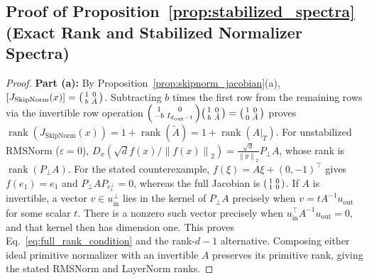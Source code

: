\documentclass[10pt]{article}
\theoremstyle{definition}
\theoremstyle{remark}
\newcommand{\norm}[1]{\left\lVert #1 \right\rVert}
\DeclareMathOperator{\rank}{rank}
\begin{document}
\subsection{Proof of Proposition~\ref{prop:stabilized_spectra} (Exact Rank and Stabilized Normalizer Spectra)}

\begin{proof}
\textbf{Part (a):} By Proposition~\ref{prop:skipnorm_jacobian}(a), $[J_{\mathrm{SkipNorm}}(x)] = \begin{psmallmatrix} 1 & 0 \\ b & \tilde{A} \end{psmallmatrix}$. Subtracting $b$ times the first row from the remaining rows via the invertible row operation $\begin{psmallmatrix} 1 & 0 \\ -b & I_{d_{\mathrm{out}}-1} \end{psmallmatrix} \begin{psmallmatrix} 1 & 0 \\ b & \tilde{A} \end{psmallmatrix} = \begin{psmallmatrix} 1 & 0 \\ 0 & \tilde{A} \end{psmallmatrix}$ proves $\rank(J_{\mathrm{SkipNorm}}(x)) = 1 + \rank(\tilde{A}) = 1 + \rank(A|_T)$. For unstabilized RMSNorm ($\varepsilon = 0$), $D_x (\sqrt{d} f(x)/\norm{f(x)}_2) = \frac{\sqrt{d}}{\norm{y}_2} P_\perp A$, whose rank is $\rank(P_\perp A)$. For the stated counterexample, $f(\xi)=A\xi+(0,-1)^\top$ gives $f(e_1)=e_1$ and $P_\perp A P_{e_1^\perp}=0$, whereas the full Jacobian is $\begin{psmallmatrix}1&0\\1&0\end{psmallmatrix}$. If $A$ is invertible, a vector $v\in u_{\mathrm{in}}^\perp$ lies in the kernel of $P_\perp A$ precisely when $v=tA^{-1}u_{\mathrm{out}}$ for some scalar $t$. There is a nonzero such vector precisely when $u_{\mathrm{in}}^\top A^{-1}u_{\mathrm{out}}=0$, and that kernel then has dimension one. This proves Eq.~\eqref{eq:full_rank_condition} and the rank-$d-1$ alternative. Composing either ideal primitive normalizer with an invertible $A$ preserves its primitive rank, giving the stated RMSNorm and LayerNorm ranks.


\end{proof}
\end{document}
